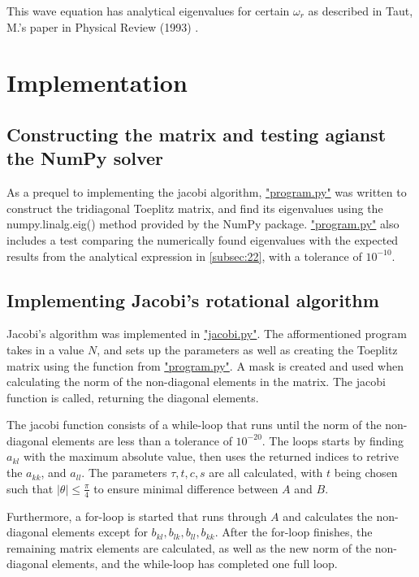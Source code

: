 \documentclass[english,notitlepage,reprint]{revtex4-1}  %
\begin{document}
This wave equation has analytical eigenvalues for certain \(\omega_{r}\) as described in Taut, M.'s paper in Physical Review (1993) \citep{PhysRevA.48.3561}.

\section{Implementation}\label{sec:3}
\subsection{Constructing the matrix and testing agianst the NumPy solver}\label{subsec:31}
As a prequel to implementing the jacobi algorithm, \hyperref[A:1]{"program.py"} was written to construct the tridiagonal Toeplitz matrix, and find its eigenvalues using the numpy.linalg.eig() method provided by the NumPy package. \hyperref[A:1]{"program.py"} also includes a test comparing the numerically found eigenvalues with the expected results from the analytical expression in \autoref{subsec:22}, with a tolerance of \(10^{-10}\).

\subsection{Implementing Jacobi's rotational algorithm}\label{subsec:32}
Jacobi's algorithm was implemented in \hyperref[A:2]{"jacobi.py"}. The afformentioned program takes in a value \(N\), and sets up the parameters as well as creating the Toeplitz matrix using the function from \hyperref[A:1]{"program.py"}. A mask is created and used when calculating the norm of the non-diagonal elements in the matrix. The jacobi function is called, returning the diagonal elements.

The jacobi function consists of a while-loop that runs until the norm of the non-diagonal elements are less than a tolerance of \(10^{-20}\). The loops starts by finding \(a_{kl}\) with the maximum absolute value, then uses the returned indices to retrive the \(a_{kk}\), and \(a_{ll}\). The parameters \(\tau,t,c,s\) are all calculated, with \(t\) being chosen such that \(|\theta|\leq\frac{\pi}{4}\) to ensure minimal difference between \(A\) and \(B\)\citep{Hjorth-Jensen2019}.

Furthermore, a for-loop is started that runs through \(A\) and calculates the non-diagonal elements except for \(b_{kl},b_{lk},b_{ll},b_{kk}\). After the for-loop finishes, the remaining matrix elements are calculated, as well as the new norm of the non-diagonal elements, and the while-loop has completed one full loop.
\end{document}
